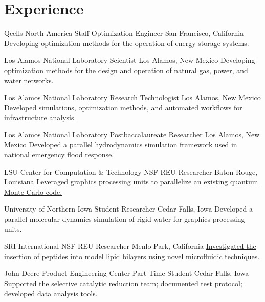 \section{Experience}
		{Qcells North America}
		{Staff Optimization Engineer}
		{San Francisco, California}{}
		{Developing optimization methods for the operation of energy storage systems.}

		{Los Alamos National Laboratory}
		{Scientist}
		{Los Alamos, New Mexico}{}
		{Developing optimization methods for the design and operation of natural gas, power, and water networks.}

		{Los Alamos National Laboratory}
		{Research Technologist}
		{Los Alamos, New Mexico}{}
		{Developed simulations, optimization methods, and automated workflows for infrastructure analysis.}

		{Los Alamos National Laboratory}
		{Postbaccalaureate Researcher}
		{Los Alamos, New Mexico}{}
		{Developed a parallel hydrodynamics simulation framework used in national emergency flood response.}

		{LSU Center for Computation \& Technology}
		{NSF REU Researcher}
		{Baton Rouge, Louisiana}{}
		{\href{http://www.institute.loni.org/lasigma/package/vmc/}{Leveraged graphics processing units to parallelize an existing quantum Monte Carlo code.}}

		{University of Northern Iowa}
		{Student Researcher}
		{Cedar Falls, Iowa}{}
		{Developed a parallel molecular dynamics simulation of rigid water for graphics processing units.}

		{SRI International}
		{NSF REU Researcher}
		{Menlo Park, California}{}
		{\href{https://www.sri.com/wp-content/uploads/2019/12/sri-reu-2011-2.pdf}{Investigated the insertion of peptides into model lipid bilayers using novel microfluidic techniques.}}

		{John Deere Product Engineering Center}
		{Part-Time Student}
		{Cedar Falls, Iowa}{}
		{Supported the \href{https://www.deere.com/en/campaigns/engines-and-drivetrain/diesel-engine-technology}{selective catalytic reduction} team; documented test protocol; developed data analysis tools.}

